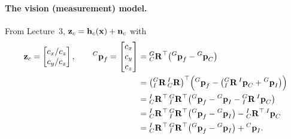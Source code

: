 \paragraph{The vision (measurement) model.} From Lecture~3, $\vect{z}_c = \vect{h}_c(\vect{x}) + \vect{n}_c$ with
\begin{align}
\vect{z}_c = \begin{bmatrix} c_x/c_z \\ c_y/c_z \end{bmatrix},
\qquad
{}^{C}\vect{p}_f = \begin{bmatrix} c_x \\ c_y \\ c_z \end{bmatrix}
&= {}^{G}_{C}\vect{R}\trans\big({}^{G}\vect{p}_f - {}^{G}\vect{p}_C\big) \notag \\
&= \big({}^{G}_{I}\vect{R}\,{}^{I}_{C}\vect{R}\big)\trans\Big({}^{G}\vect{p}_f - \big({}^{G}_{I}\vect{R}\,{}^{I}\vect{p}_C + {}^{G}\vect{p}_I\big)\Big) \\
&= {}^{I}_{C}\vect{R}\trans\,{}^{G}_{I}\vect{R}\trans\big({}^{G}\vect{p}_f - {}^{G}\vect{p}_I - {}^{G}_{I}\vect{R}\,{}^{I}\vect{p}_C\big) \\
&= {}^{I}_{C}\vect{R}\trans\,{}^{G}_{I}\vect{R}\trans\big({}^{G}\vect{p}_f - {}^{G}\vect{p}_I\big) - {}^{I}_{C}\vect{R}\trans\,{}^{I}\vect{p}_C \\
&= {}^{I}_{C}\vect{R}\trans\,{}^{G}_{I}\vect{R}\trans\big({}^{G}\vect{p}_f - {}^{G}\vect{p}_I\big) + {}^{C}\vect{p}_I.
\end{align}

